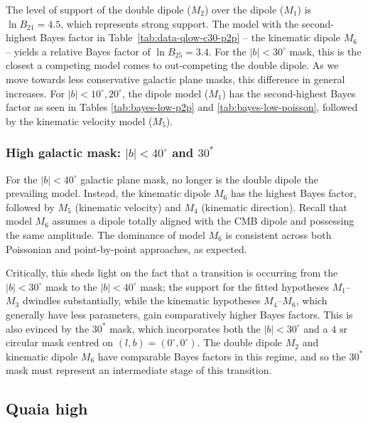 \documentclass[fleqn,usenatbib]{mnras}
\begin{document}
        The level of support of the double dipole ($M_2$) over the dipole ($M_1$) is $\ln B_{21} = 4.5$, which represents strong support.
        The model with the second-highest Bayes factor in Table~\ref{tab:data-qlow-c30-p2p} -- the kinematic dipole $M_6$ -- yields a relative Bayes factor of $\ln B_{25} = 3.4$.
        For the $|b| < 30^\circ$ mask, this is the closest a competing model comes to out-competing the double dipole.
        As we move towards less conservative galactic plane masks, this difference in general increases.
        For $|b| < 10^\circ, 20^\circ$, the dipole model ($M_1$) has the second-highest Bayes factor as seen in Tables \ref{tab:bayes-low-p2p} and \ref{tab:bayes-low-poisson}, followed by the kinematic velocity model ($M_5$).
    
    \subsubsection{High galactic mask: $|b| < 40^\circ$ and $30^*$}
        \label{subs:high-gal-masks-low}
        For the $|b| < 40^\circ$ galactic plane mask, no longer is the double dipole the prevailing model.
        Instead, the kinematic dipole $M_6$ has the highest Bayes factor, followed by $M_5$ (kinematic velocity) and $M_4$ (kinematic direction).
        Recall that model $M_6$ assumes a dipole totally aligned with the CMB dipole and possessing the same amplitude.
        The dominance of model $M_6$ is consistent across both Poissonian and point-by-point approaches, as expected.
        
        Critically, this sheds light on the fact that a transition is occurring from the $|b| < 30^\circ$ mask to the $|b| < 40^\circ$ mask; the support for the fitted hypotheses $M_1$--$M_3$ dwindles substantially, while the kinematic hypotheses $M_4$--$M_6$, which generally have less parameters, gain comparatively higher Bayes factors.
        This is also evinced by the $30^*$ mask, which incorporates both the $|b| < 30^\circ$ and a $4 \text{ sr}$ circular mask centred on $(l,b) = (0^\circ, 0^\circ)$.
        The double dipole $M_2$ and kinematic dipole $M_6$ have comparable Bayes factors in this regime, and so the $30^*$ mask must represent an intermediate stage of this transition.
    
    \subsection{Quaia high}
        
\end{document}
